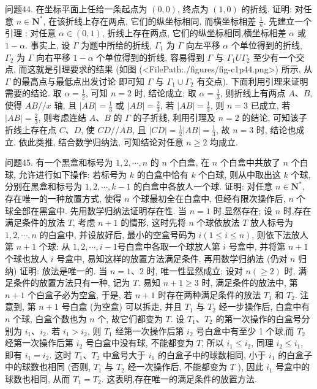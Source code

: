 问题44. 在坐标平面上任给一条起点为 $(0,0)$, 终点为 $(1,0)$ 的折线.
证明: 对任意 $n \in \mathbf{N}^*$, 在该折线上存在两点, 它们的纵坐标相同, 而横坐标相差 $\frac{1}{n}$.
先建立一个引理 : 对任意 $\alpha \in(0,1)$, 折线上存在两点, 它们的纵坐标相同,横坐标相差 $\alpha$ 或 $1-\alpha$.
事实上, 设 $\Gamma$ 为题中所给的折线, $\Gamma_1$ 为 $\Gamma$ 向左平移 $\alpha$ 个单位得到的折线, $\Gamma_2$ 为 $\Gamma$ 向右平移 $1-\alpha$ 个单位得到的折线, 容易得到 $\Gamma$ 与 $\Gamma_1 U \Gamma_2$ 至少有一个交点, 而这就是引理要求的结果 (如图 (<FilePath:./figures/fig-c1p44.png>) 所示, 从 $\Gamma$ 的最高点与最低点出发讨论
 即可知 $\Gamma$ 与 $\Gamma_1 \cup \Gamma_2$ 有交点).
下面利用引理来证明需要的结论.
取 $\alpha=\frac{1}{2}$, 可知 $n=2$ 时, 结论成立; 取 $\alpha=\frac{1}{3}$, 则折线上有两点 $A 、 B$, 使得 $A B / / x$ 轴, 且 $|A B|=\frac{1}{3}$ 或 $|A B|=\frac{2}{3}$, 若 $|A B|=\frac{1}{3}$, 则 $n=3$ 已成立, 若 $|A B|=\frac{2}{3}$, 则考虑连结 $A 、 B$ 的 $\Gamma$ 的子折线, 利用引理及 $n=2$ 的结论, 可知该子折线上存在点 $C 、 D$, 使 $C D / / A B$, 且 $|C D|=\frac{1}{2}|A B|=\frac{1}{3}$, 故 $n=3$ 时, 结论也成立.
依此类推, 结合数学归纳法, 可知结论对任意 $n \geqslant 2$ 均成立.



问题45. 有一个黑盒和标号为 $1,2, \cdots, n$ 的 $n$ 个白盒, 在 $n$ 个白盒中共放了 $n$ 个白球, 允许进行如下操作: 若标号为 $k$ 的白盒中恰有 $k$ 个白球, 则从中取出这 $k$ 个球, 分别在黑盒和标号为 $1,2, \cdots, k-1$ 的白盒中各放人一个球.
证明: 对任意 $n \in \mathbf{N}^*$, 存在唯一的一种放置方式, 使得 $n$ 个球最初全在白盒中, 但经有限次操作后, $n$ 个球全部在黑盒中.
先用数学归纳法证明存在性.
当 $n=1$ 时,显然存在; 设 $n$ 时,存在满足条件的放法 $T$, 考虑 $n+1$ 的情形, 这时先将 $n$ 个球依放法 $T$ 放人标号为 $1,2, \cdots, n$ 的白盒中, 并设放好后, 最小的空盒号码为 $i(1 \leqslant i \leqslant n)$, 则依下法放人第 $n+1$ 个球: 从 $1,2, \cdots, i-1$号白盒中各取一个球放人第 $i$ 号盒中, 并将第 $n+1$ 个球也放人 $i$ 号盒中, 易知这样的放置方法满足条件.
再用数学归纳法 (仍对 $n$ 归纳) 证明: 放法是唯一的.
当 $n=1 、 2$ 时, 唯一性显然成立; 设对 $n(\geqslant 2)$ 时, 满足条件的放置方法只有一种, 记为 $T$.
易知 $n+1 \geqslant 3$ 时, 满足条件的放法中, 第 $n+1$ 个白盒子必为空盒, 于是, 若 $n+1$ 时存在两种满足条件的放法 $T_1$ 和 $T_2$. 注意到, 第 $n+1$ 号白盒 (为空盒) 可以拆走, 并且 $T_1$ 与 $T_2$ 经一步操作后, 白盒中有 $n$ 个球, 白盒个数也为 $n$ 个, 故它们都变为 $T$.
设 $T_1 、 T_2$ 的第一次操作的白盒号分别为 $i_1 、 i_2$. 若 $i_1>i_2$, 则 $T_1$ 经第一次操作后第 $i_2$ 号白盒中有至少 1 个球,而 $T_2$ 经第一次操作后第 $i_2$ 号白盒中没有球, 不能都变为 $T$, 所以 $i_1 \leqslant i_2$, 同理 $i_2 \leqslant i_1$, 即有 $i_1=i_2$. 这时 $T_1 、 T_2$ 中盒号大于 $i_1$ 的白盒子中的球数相同, 小于 $i_1$ 的白盒子中的球数也相同 (否则, $T_1$ 与 $T_2$ 经一次操作后, 不能都变为 $T$ ), 因此 $i_1$ 号盒中的球数也相同, 从而 $T_1=T_2$. 这表明,存在唯一的满足条件的放置方法.



